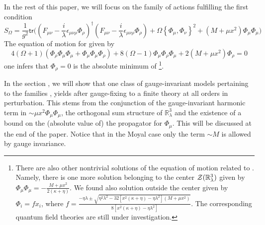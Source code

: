 \documentclass[10pt]{book}
\newcommand{\tr}{\mathsf{tr}}
\theoremstyle{break}
\begin{document}
In the rest of this paper, we will focus on the family of actions fulfilling the first condition %
\begin{equation*}
S_\Omega = \frac{1}{g^2} \tr\big((F_{\mu\nu} - \frac{i}{\lambda} \epsilon_{\mu\nu\rho} \Phi_\rho)^\dag (F_{\mu\nu} - \frac{i}{\lambda} \epsilon_{\mu\nu\rho} \Phi_\rho) + \Omega\left\{\Phi_\mu,\Phi_\nu\right\}^2 + (M+\mu x^2) \Phi_\mu \Phi_\mu \big) %
\end{equation*}
The equation of motion for %
given by
\begin{equation*}
4(\Omega+1)(\Phi_\rho\Phi_\mu\Phi_\mu+\Phi_\mu\Phi_\mu\Phi_\rho)+8(\Omega-1)\Phi_\mu\Phi_\rho\Phi_\mu+2(M+\mu x^2) \Phi_\rho = 0%
\end{equation*}
one infers that $\Phi_\rho=0$ is the absolute minimum of %
\footnote{There are also other nontrivial solutions of the equation of motion related to %
. Namely, there is one more solution belonging to the center ${\cal{Z}}(\mathbb{R}^3_\lambda)$ given by $\Phi_{\mu}\Phi_{\mu}=-\frac{M+\mu x^2}{2(\kappa+\eta)}$. We found also solution outside the center given by $\Phi_i=fx_i$, where $f=\frac{-\eta\lambda\pm\sqrt{\eta^2\lambda^2-32\left[x^2(\kappa+\eta)-\eta\lambda^2\right](M+\mu x^2)}}{8\left[x^2(\kappa+\eta)-\eta\lambda^2\right]}$. The corresponding quantum field theories are still under investigation. }.\par

In the section %
, we will show that one class of gauge-invariant models pertaining to the families %
, %
yields after gauge-fixing to a finite theory at all orders in perturbation. This stems from the conjunction of the gauge-invariant harmonic term in %
$\sim \mu x^2\Phi_\mu\Phi_\mu$, the orthogonal sum structure of $\mathbb{R}^3_\lambda$ %
and the existence of a bound on the (absolute value of) the propagator for $\Phi_\mu$. This will be discussed at the end of the paper. Notice that in the Moyal case only the term $\sim M$ is allowed by gauge invariance.

\end{document}

